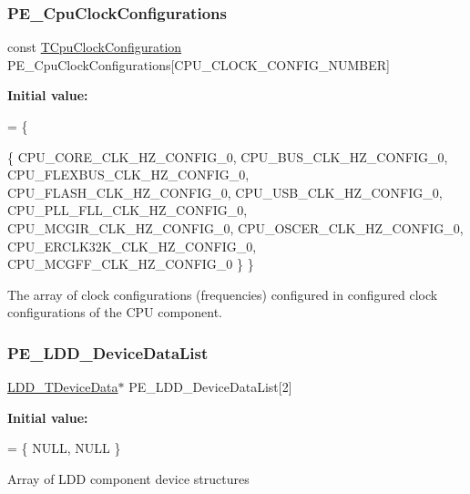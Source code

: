 \subsubsection{\texorpdfstring{P\+E\+\_\+\+Cpu\+Clock\+Configurations}{PE\_CpuClockConfigurations}}
{\footnotesize\ttfamily const \hyperlink{struct_t_cpu_clock_configuration}{T\+Cpu\+Clock\+Configuration} P\+E\+\_\+\+Cpu\+Clock\+Configurations\mbox{[}C\+P\+U\+\_\+\+C\+L\+O\+C\+K\+\_\+\+C\+O\+N\+F\+I\+G\+\_\+\+N\+U\+M\+B\+ER\mbox{]}}

{\bfseries Initial value\+:}
\begin{DoxyCode}
= \{
  
  \{
    CPU\_CORE\_CLK\_HZ\_CONFIG\_0,          
    CPU\_BUS\_CLK\_HZ\_CONFIG\_0,           
    CPU\_FLEXBUS\_CLK\_HZ\_CONFIG\_0,       
    CPU\_FLASH\_CLK\_HZ\_CONFIG\_0,         
    CPU\_USB\_CLK\_HZ\_CONFIG\_0,           
    CPU\_PLL\_FLL\_CLK\_HZ\_CONFIG\_0,       
    CPU\_MCGIR\_CLK\_HZ\_CONFIG\_0,         
    CPU\_OSCER\_CLK\_HZ\_CONFIG\_0,         
    CPU\_ERCLK32K\_CLK\_HZ\_CONFIG\_0,      
    CPU\_MCGFF\_CLK\_HZ\_CONFIG\_0          
  \}
\}
\end{DoxyCode}
The array of clock configurations (frequencies) configured in configured clock configurations of the C\+PU component. \mbox{\label{group___p_e___l_d_d__module_gaaf8ebb1e57f3e6dad9f221a8b30f38dd}} 
\subsubsection{\texorpdfstring{P\+E\+\_\+\+L\+D\+D\+\_\+\+Device\+Data\+List}{PE\_LDD\_DeviceDataList}}
{\footnotesize\ttfamily \hyperlink{group___p_e___types__module_gac5cf1362f1f0e3a2ce71b1bf2276d091}{L\+D\+D\+\_\+\+T\+Device\+Data}$\ast$ P\+E\+\_\+\+L\+D\+D\+\_\+\+Device\+Data\+List\mbox{[}2\mbox{]}}

{\bfseries Initial value\+:}
\begin{DoxyCode}
= \{
    NULL,
    NULL
  \}
\end{DoxyCode}
Array of L\+DD component device structures 